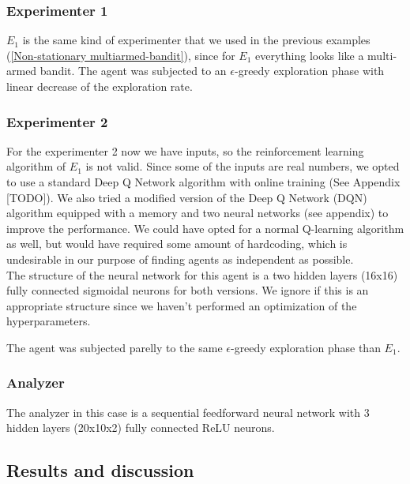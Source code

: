 \documentclass[11pt,a4paper,twoside]{report}
\newcommand{\+}{\textnormal{+} }
\theoremstyle{definition}
\numberwithin{equation}{chapter}
\begin{document}
\subsubsection{Experimenter 1}
$E_1$ is the same kind of experimenter that we used in the previous examples
(\ref{Non-stationary multiarmed-bandit}), since for $E_1$ everything looks like
a multi-armed bandit. The agent was subjected to an $\epsilon$-greedy 
exploration phase with linear decrease of the exploration rate.
\subsubsection{Experimenter 2}
For the experimenter 2 now we have inputs, so the reinforcement learning
algorithm of $E_1$ is not valid. Since some of the inputs are real numbers, we
opted to use a standard Deep Q Network algorithm with online training (See
Appendix [TODO]). We also tried a modified version of the Deep Q Network (DQN)
algorithm equipped with a memory and two neural networks (see appendix) to
improve the performance. We could have opted for a normal Q-learning algorithm
as well, but would have required some amount of hardcoding, which is undesirable
in our purpose of finding agents as independent as possible. 
\\
\noindent The structure of the neural network for this agent is a two hidden layers  
(16x16) fully connected sigmoidal neurons for both versions. We ignore if this 
is an appropriate structure since we haven't performed an optimization of the
hyperparameters.

\noindent The agent was subjected parelly to the same $\epsilon$-greedy
exploration phase than $E_1$.

\subsubsection{Analyzer}

The analyzer in this case is a sequential feedforward neural network with 
3 hidden layers (20x10x2) fully connected ReLU neurons.
\subsection{Results and discussion}
\end{document}
